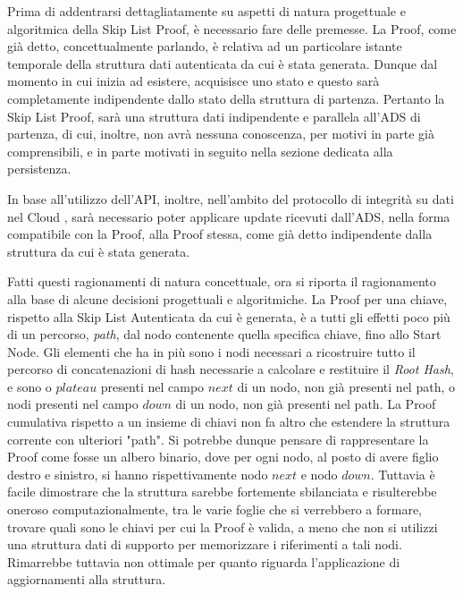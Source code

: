 	

		Prima di addentrarsi dettagliatamente su aspetti di natura progettuale e algoritmica della Skip List Proof, è necessario fare delle premesse. La Proof, come già detto, concettualmente parlando, è relativa ad un particolare istante temporale della struttura dati autenticata da cui è stata generata. Dunque dal momento in cui inizia ad esistere, acquisisce uno stato e questo sarà completamente indipendente dallo stato della struttura di partenza. Pertanto la Skip List Proof, sarà una struttura dati indipendente e parallela all'ADS di partenza, di cui, inoltre, non avrà nessuna conoscenza, per motivi in parte già comprensibili, e in parte motivati in seguito nella sezione dedicata alla persistenza.

		In base all'utilizzo dell'API, inoltre, nell'ambito del protocollo di integrità su dati nel Cloud \cite{main_project}, sarà necessario poter applicare update ricevuti dall'ADS, nella forma compatibile con la Proof, alla Proof stessa, come già detto indipendente dalla struttura da cui è stata generata.
		
		Fatti questi ragionamenti di natura concettuale, ora si riporta il ragionamento alla base di alcune decisioni progettuali e algoritmiche. La Proof per una chiave, rispetto alla Skip List Autenticata da cui è generata, è a tutti gli effetti poco più di un percorso, \textit{path}, dal nodo contenente quella specifica chiave, fino allo Start Node. Gli elementi che ha in più sono i nodi necessari a ricostruire tutto il percorso di concatenazioni di hash necessarie a calcolare e restituire il \textit{Root Hash}, e sono o $ plateau $ presenti nel campo $ next $ di un nodo, non già presenti nel path, o nodi presenti nel campo $ down $ di un nodo, non già presenti nel path. La Proof cumulativa rispetto a un insieme di chiavi non fa altro che estendere la struttura corrente con ulteriori "path".
		Si potrebbe dunque pensare di rappresentare la Proof come fosse un albero binario, dove per ogni nodo, al posto di avere figlio destro e sinistro, si hanno rispettivamente nodo $ next $ e nodo $ down $. Tuttavia è facile dimostrare che la struttura sarebbe fortemente sbilanciata e risulterebbe oneroso computazionalmente, tra le varie foglie che si verrebbero a formare, trovare quali sono le chiavi per cui la Proof è valida, a meno che non si utilizzi una struttura dati di supporto per memorizzare i riferimenti a tali nodi. Rimarrebbe tuttavia non ottimale per quanto riguarda l'applicazione di aggiornamenti alla struttura.
 				
